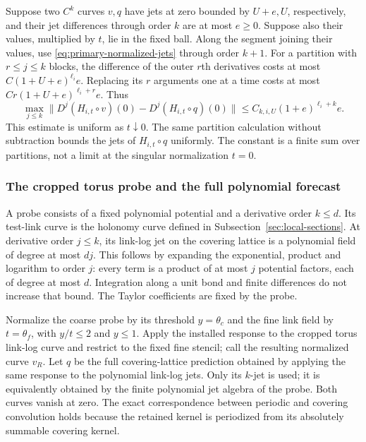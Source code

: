 Suppose two $C^k$ curves $v,q$ have jets at zero bounded by $U+e,U$,
respectively, and their jet differences through order $k$ are at most
$e\ge0$. Suppose also their values, multiplied by $t$, lie in the
fixed ball. Along the segment joining their values, use
\eqref{eq:primary-normalized-jets} through order $k+1$.
For a partition with $r\le j\le k$ blocks, the difference of the
outer $r$th derivatives costs at most
$C(1+U+e)^{\ell_i}e$. Replacing its $r$ arguments one at a time
costs at most $Cr(1+U+e)^{\ell_i+r}e$. Thus
\begin{equation}\label{eq:primary-stencil-stability}
 \max_{j\le k}\|D^j(H_{i,t}\circ v)(0)
                   -D^j(H_{i,t}\circ q)(0)\|
           \le C_{k,i,U}(1+e)^{\ell_i+k}e.
\end{equation}
This estimate is uniform as $t\downarrow0$. The same partition
calculation without subtraction bounds the jets of
$H_{i,t}\circ q$ uniformly. The constant is a finite sum over
partitions, not a limit at the singular normalization $t=0$.

\subsubsection{The cropped torus probe and the full polynomial forecast}
A probe consists of a fixed polynomial potential and a derivative
order $k\le d$. Its test-link curve is the holonomy curve defined in
Subsection~\ref{sec:local-sections}. At derivative order $j\le k$,
its link-log jet on the covering lattice is a polynomial field of
degree at most $dj$. This follows by expanding the exponential,
product and logarithm to order $j$: every term is a product of at
most $j$ potential factors, each of degree at most $d$. Integration
along a unit bond and finite differences do not increase that bound.
The Taylor coefficients are fixed by the probe.

Normalize the coarse probe by its threshold $y=\theta_c$ and the
fine link field by $t=\theta_f$, with $y/t\le2$ and $y\le1$.
Apply the installed response to the cropped torus link-log curve and
restrict to the fixed fine stencil; call the resulting normalized
curve $v_R$. Let $q$ be the full covering-lattice prediction obtained
by applying the same response to the polynomial link-log jets.
Only its $k$-jet is used; it is equivalently obtained by the finite
polynomial jet algebra of the probe. Both curves vanish at zero.
The exact correspondence between periodic and covering convolution
holds because the retained kernel is periodized from its absolutely
summable covering kernel.

